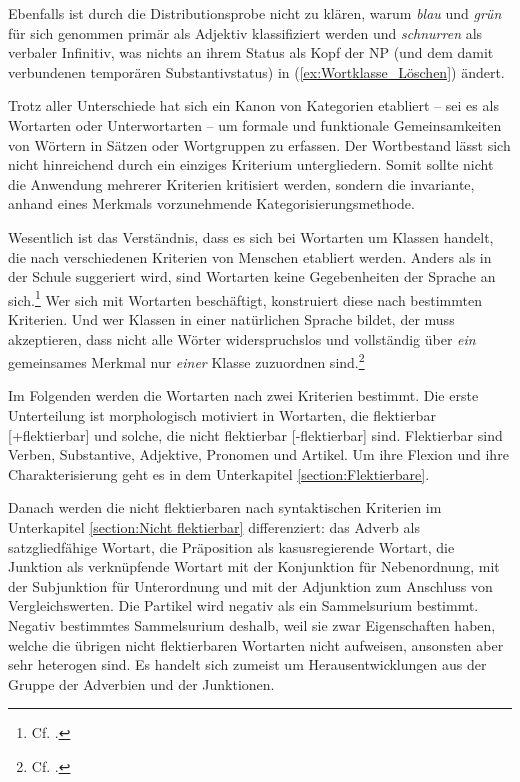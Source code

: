 Ebenfalls ist durch die Distributionsprobe nicht zu klären, warum \textit{blau} und \textit{grün} für sich genommen primär als Adjektiv klassifiziert werden und \textit{schnurren} als verbaler Infinitiv, was nichts an ihrem Status als Kopf der NP (und dem damit verbundenen temporären Substantivstatus) in (\ref{ex:Wortklasse_Löschen}) ändert. 

Trotz aller Unterschiede hat sich ein Kanon von Kategorien etabliert -- sei es als Wortarten oder Unterwortarten -- um formale und funktionale Gemeinsamkeiten von Wörtern in Sätzen oder Wortgruppen zu erfassen. Der Wortbestand lässt sich nicht hinreichend durch ein einziges Kriterium untergliedern. Somit sollte nicht die Anwendung mehrerer Kriterien kritisiert werden, sondern die invariante, anhand eines Merkmals vorzunehmende Kategorisierungsmethode.

Wesentlich ist das Verständnis, dass es sich bei Wortarten um Klassen handelt, die nach verschiedenen Kriterien von Menschen etabliert werden. Anders als in der Schule suggeriert wird, sind Wortarten keine Gegebenheiten der Sprache an sich.\footnote{Cf. \citet[99]{Gehrig2014}.} Wer sich mit Wortarten beschäftigt, konstruiert diese nach bestimmten Kriterien. Und wer Klassen in einer natürlichen Sprache bildet, der muss akzeptieren, dass nicht alle Wörter widerspruchslos und vollständig über \textit{ein} gemeinsames Merkmal nur \textit{einer} Klasse zuzuordnen sind.\footnote{Cf. \citet[4--6]{Lehmann2005Wortart}.}

Im Folgenden werden die Wortarten nach zwei Kriterien bestimmt. Die erste Unterteilung ist morphologisch motiviert in Wortarten, die flektierbar [+flektierbar] und solche, die nicht flektierbar [-flektierbar] sind. Flektierbar sind Verben, Substantive, Adjektive, Pronomen und Artikel. Um ihre Flexion und ihre Charakterisierung geht es in dem Unterkapitel \ref{section:Flektierbare}. 

Danach werden die nicht flektierbaren nach syntaktischen Kriterien im Unterkapitel \ref{section:Nicht flektierbar} differenziert: das Adverb als satzgliedfähige Wortart, die Präposition als kasusregierende Wortart, die Junktion als verknüpfende Wortart mit der Konjunktion für Nebenordnung, mit der Subjunktion für Unterordnung und mit der Adjunktion zum Anschluss von Vergleichswerten. Die Partikel wird negativ als ein Sammelsurium bestimmt. Negativ bestimmtes Sammelsurium deshalb, weil sie zwar Eigenschaften haben, welche die übrigen nicht flektierbaren Wortarten nicht aufweisen, ansonsten aber sehr heterogen sind. Es handelt sich zumeist um Herausentwicklungen aus der Gruppe der Adverbien und der Junktionen.

